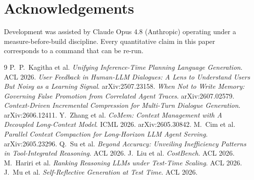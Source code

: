 \documentclass[10pt,twocolumn]{article}
\begin{document}
\section*{Acknowledgements}

Development was assisted by Claude Opus 4.8 (Anthropic) operating under a
measure-before-build discipline. Every quantitative claim in this paper corresponds to a
command that can be re-run.

\begin{thebibliography}{9}\small
{} P.\ P.\ Kagitha et al.
  \emph{Unifying Inference-Time Planning Language Generation}. ACL 2026.
 \emph{User Feedback in Human-LLM Dialogues: A Lens to Understand Users
  But Noisy as a Learning Signal}. arXiv:2507.23158.
 \emph{When Not to Write Memory: Governing False Promotion from
  Correlated Agent Traces}. arXiv:2607.02579.
 \emph{Context-Driven Incremental Compression for Multi-Turn Dialogue
  Generation}. arXiv:2606.12411.
 Y.\ Zhang et al. \emph{CoMem: Context Management with A Decoupled
  Long-Context Model}. ICML 2026. arXiv:2605.30842.
 M.\ Cim et al. \emph{Parallel Context Compaction for Long-Horizon LLM
  Agent Serving}. arXiv:2605.23296.
 Q.\ Su et al. \emph{Beyond Accuracy: Unveiling Inefficiency Patterns in
  Tool-Integrated Reasoning}. ACL 2026.
 J.\ Liu et al. \emph{CostBench}. ACL 2026.
 M.\ Hariri et al. \emph{Ranking Reasoning LLMs under Test-Time
  Scaling}. ACL 2026.
 J.\ Mu et al. \emph{Self-Reflective Generation at Test Time}. ACL 2026.
\end{thebibliography}
\end{document}
